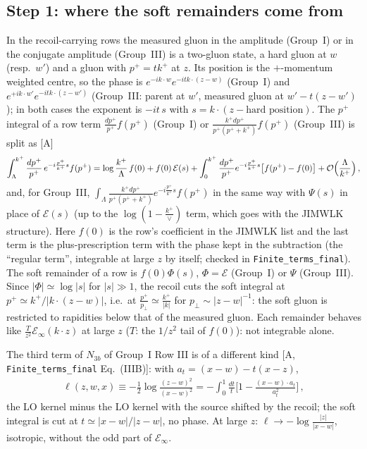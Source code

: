 \subsection{Step 1: where the soft remainders come from}
\noindent In the recoil-carrying rows the measured gluon in the amplitude (Group~I) or in the conjugate amplitude (Group~III) is a two-gluon state, a hard gluon at $w$ (resp.\ $w'$) and a gluon with $p^{+}=tk^{+}$ at $z$. Its position is the $+$-momentum weighted centre, so the phase is $e^{-ik\cdot w}e^{-itk\cdot(z-w)}$ (Group~I) and $e^{+ik\cdot w'}e^{-itk\cdot(z-w')}$ (Group~III: parent at $w'$, measured gluon at $w'-t(z-w')$); in both cases the exponent is $-it\,s$ with $s=k\cdot(z-\text{hard position})$. The $p^{+}$ integral of a row term $\frac{dp^{+}}{p^{+}}f(p^{+})$ (Group~I) or $\frac{k^{+}dp^{+}}{p^{+}(p^{+}+k^{+})}f(p^{+})$ (Group~III) is split as [A]
\begin{align}
\int_{\Lambda}^{k^{+}}\frac{dp^{+}}{p^{+}}\,e^{-i\frac{p^{+}}{k^{+}}s}f(p^{+})=\log\frac{k^{+}}{\Lambda}\,f(0)+f(0)\,\mathcal{E}(s)+\int_{0}^{k^{+}}\frac{dp^{+}}{p^{+}}e^{-i\frac{p^{+}}{k^{+}}s}\big[f(p^{+})-f(0)\big]+{\cal O}\Big(\frac{\Lambda}{k^{+}}\Big)\,,\label{sf:split}
\end{align}
and, for Group~III, $\int_{\Lambda}\frac{k^{+}dp^{+}}{p^{+}(p^{+}+k^{+})}e^{-i\frac{p^{+}}{k^{+}}s}f(p^{+})$ in the same way with $\Psi(s)$ in place of $\mathcal{E}(s)$ (up to the $\log(1-\frac{k^{+}}{\vee})$ term, which goes with the JIMWLK structure). Here $f(0)$ is the row's coefficient in the JIMWLK list and the last term is the plus-prescription term with the phase kept in the subtraction (the ``regular term'', integrable at large $z$ by itself; checked in \texttt{Finite\_terms\_final}). The soft remainder of a row is $f(0)\Phi(s)$, $\Phi=\mathcal{E}$ (Group~I) or $\Psi$ (Group~III). Since $|\Phi|\simeq\log|s|$ for $|s|\gg1$, the recoil cuts the soft integral at $p^{+}\simeq k^{+}/|k\cdot(z-w)|$, i.e.\ at $\frac{p^{+}}{p_{\perp}}\simeq\frac{k^{+}}{|k|}$ for $p_{\perp}\sim|z-w|^{-1}$: the soft gluon is restricted to rapidities below that of the measured gluon. Each remainder behaves like $\frac{T}{z^{2}}\mathcal{E}_{\infty}(k\cdot z)$ at large $z$ ($T$: the $1/z^{2}$ tail of $f(0)$): not integrable alone.

The third term of $N_{3b}$ of Group~I Row III is of a different kind [A, \texttt{Finite\_terms\_final} Eq.~(IIIB)]: with $a_{t}=(x-w)-t(x-z)$,
\begin{align}
\ell(z,w,x)\equiv-\frac12\log\frac{(z-w)^{2}}{(x-w)^{2}}=-\int_{0}^{1}\frac{dt}{t}\Big[1-\frac{(x-w)\cdot a_{t}}{a_{t}^{2}}\Big]\,,\label{sf:ell}
\end{align}
the LO kernel minus the LO kernel with the source shifted by the recoil; the soft integral is cut at $t\simeq|x-w|/|z-w|$, no phase. At large $z$: $\ell\to-\log\frac{|z|}{|x-w|}$, isotropic, without the odd part of $\mathcal{E}_{\infty}$.

